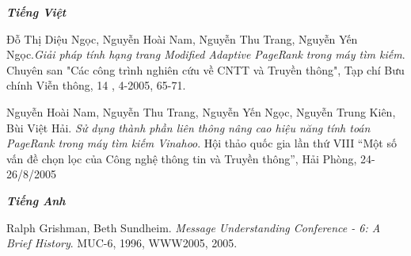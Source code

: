 \begin{thebibliography}{99}


\begin{flushright}
	{\Large\bf\emph{Tiếng Việt}}
\end{flushright}
	Đỗ Thị Diệu Ngọc, Nguyễn Hoài Nam, Nguyễn Thu Trang,
	 Nguyễn Yến Ngọc.\textit{Giải pháp tính hạng trang Modified Adaptive
	 PageRank trong máy tìm kiếm}. Chuyên san "Các công trình nghiên cứu
	 về CNTT và Truyền thông", Tạp chí Bưu chính Viễn thông, 14 , 4-2005, 65-71.

	 Nguyễn Hoài Nam, Nguyễn Thu Trang, Nguyễn Yến Ngọc, Nguyễn
	Trung Kiên, Bùi Việt Hải. \emph{Sử dụng thành phần liên thông nâng cao
	hiệu năng tính toán PageRank trong máy tìm kiếm Vinahoo}. Hội thảo quốc gia
	lần thứ VIII “Một số vấn đề chọn lọc của Công nghệ thông tin và Truyền
	thông”, Hải Phòng, 24-26/8/2005

\begin{flushright}
{\Large\bf\emph{Tiếng Anh}}
\end{flushright}

		 Ralph Grishman, Beth Sundheim. \emph{Message Understanding Conference - 6: A Brief History}. MUC-6, 1996,
		WWW2005, 2005.

%
%
\end{thebibliography}